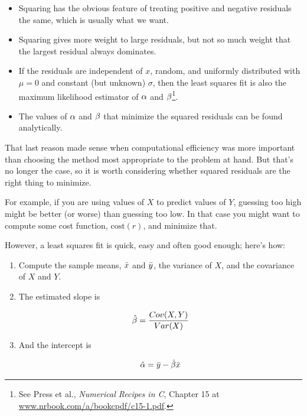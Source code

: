 \documentclass[12pt]{book}
\begin{document}
\begin{itemize}

\item Squaring has the obvious feature of treating positive and
negative residuals the same, which is usually what we want.

\item Squaring gives more weight to large residuals, but not
so much weight that the largest residual always dominates.

\item If the residuals are independent of $x$, random, and uniformly
  distributed with $\mu=0$ and constant (but unknown) $\sigma$, then
  the least squares fit is also the maximum likelihood estimator of
  $\alpha$ and $\beta$\footnote{See Press et al., {\em Numerical Recipes in C},
    Chapter 15 at \url{www.nrbook.com/a/bookcpdf/c15-1.pdf}.}.

\item The values of $\alpha$ and $\beta$ that minimize the squared
  residuals can be found analytically.

\end{itemize}

That last reason made sense when computational efficiency was more
important than choosing the method most appropriate to the problem
at hand.  But that's no longer the case, so it is worth considering
whether squared residuals are the right thing to minimize.

For example, if you are using values of $X$ to predict values of $Y$,
guessing too high might be better (or worse) than
guessing too low.  In that case you might want to compute some
cost function, $\mathrm{cost}(r)$, and minimize that.

However, a least squares fit is quick, easy and often good enough;
here's how:

\begin{enumerate}

\item Compute the sample means, $\bar{x}$ and $\bar{y}$, the variance
of $X$, and the covariance of $X$ and $Y$.

\item The estimated slope is

\[ \hat{\beta} = \frac{Cov(X,Y)}{Var(X)} \]

\item And the intercept is

\[ \hat{\alpha} = \bar{y} - \hat{\beta} \bar{x}\]

\end{enumerate}
\end{document}
